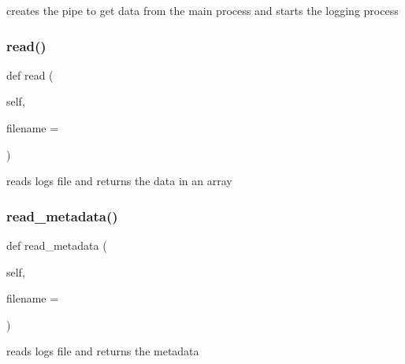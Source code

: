 \begin{DoxyVerb}creates the pipe to get data from the main process and starts the logging process\end{DoxyVerb}
 \mbox{\label{classjson_logs_1_1json_logs_a79236e82e1d1ede4e7764e8bec7f1ed9}} 
\subsubsection{\texorpdfstring{read()}{read()}}
{\footnotesize\ttfamily def read (\begin{DoxyParamCaption}\item[{}]{self,  }\item[{}]{filename = {\ttfamily \textquotesingle{}\textquotesingle{}} }\end{DoxyParamCaption})}

\begin{DoxyVerb}reads logs file and returns the data in an array\end{DoxyVerb}
 \mbox{\label{classjson_logs_1_1json_logs_add2df0fb8f3ad92514b450e14e5ff410}} 
\subsubsection{\texorpdfstring{read\+\_\+metadata()}{read\_metadata()}}
{\footnotesize\ttfamily def read\+\_\+metadata (\begin{DoxyParamCaption}\item[{}]{self,  }\item[{}]{filename = {\ttfamily \textquotesingle{}\textquotesingle{}} }\end{DoxyParamCaption})}

\begin{DoxyVerb}reads logs file and returns the metadata\end{DoxyVerb}
 \mbox{\label{classjson_logs_1_1json_logs_af1af6ddf04f00f958949618f79c33b82}} 
